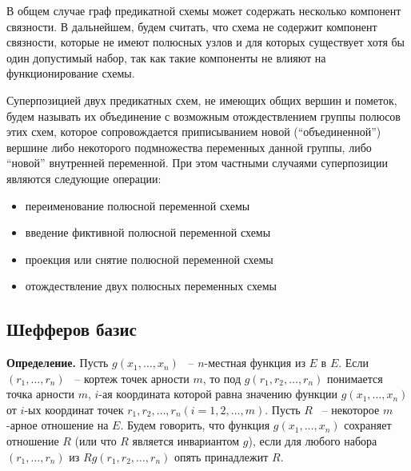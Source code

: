 \documentclass[12pt]{article}
\begin{document}
В общем случае граф предикатной схемы может содержать несколько компонент связности. 
В дальнейшем, будем считать, что схема не содержит компонент связности, 
которые не имеют полюсных узлов и для которых существует хотя бы один допустимый набор, так как такие компоненты не влияют на функционирование схемы.

Суперпозицией двух предикатных схем, не имеющих общих вершин и пометок, 
будем называть их объединение с возможным отождествлением группы полюсов этих схем, 
которое сопровождается приписыванием новой (``объединенной'') вершине либо 
некоторого подмножества переменных данной группы, либо ``новой'' внутренней переменной.
 При этом частными случаями суперпозиции являются следующие операции:
\begin{itemize}
\item переименование полюсной переменной схемы

\item введение фиктивной полюсной переменной схемы

\item проекция или снятие полюсной переменной схемы

\item отождествление двух полюсных переменных схемы
\end{itemize}

\subsection{Шефферов базис}

\textbf{Определение.} Пусть $g(x_1, \ldots, x_n)$ ~-- $n$-местная функция из $E$ в $E$. Если $(r_1, \ldots, r_n)$ ~-- кортеж
точек арности $m$, то под $g(r_1, r_2, \ldots , r_n)$ понимается точка арности $m$, $i$-ая координата которой равна значению
функции $g(x_1, \ldots ,x_n)$ от $i$-ых координат точек $r_1, r_2, \ldots , r_n (i = 1, 2, \ldots, m)$.
Пусть $R$ ~-- некоторое $m$-арное отношение на $E$. Будем говорить, что функция $g(x_1, \ldots , x_n)$
сохраняет отношение $R$ (или что $R$ является инвариантом $g$), если для любого набора $(r_1, \ldots , r_n)$ из $R g(r_1, r_2, \ldots , r_n)$ опять принадлежит $R$.
\cite{Bodnar69}
\end{document}
